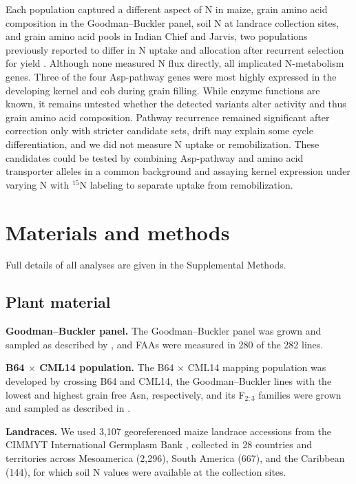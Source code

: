 \documentclass[namedate,unnumsec,webpdf,contemporary,large]{oup-authoring-template}
\begin{document}
Each population captured a different aspect of N in maize, grain amino acid composition in the Goodman--Buckler panel, soil N at landrace collection sites, and grain amino acid pools in Indian Chief and Jarvis, two populations previously reported to differ in N uptake and allocation after recurrent selection for yield \citep{Moll1994}. Although none measured N flux directly, all implicated N-metabolism genes. Three of the four Asp-pathway genes were most highly expressed in the developing kernel and cob during grain filling. While enzyme functions are known, it remains untested whether the detected variants alter activity and thus grain amino acid composition. Pathway recurrence remained significant after correction only with stricter candidate sets, drift may explain some cycle differentiation, and we did not measure N uptake or remobilization. These candidates could be tested by combining Asp-pathway and amino acid transporter alleles in a common background and assaying kernel expression under varying N with $^{15}$N labeling to separate uptake from remobilization.


\section{Materials and methods}
Full details of all analyses are given in the Supplemental Methods.

\subsection{Plant material}

\noindent\textbf{Goodman--Buckler panel.} The Goodman--Buckler panel \citep{FlintGarcia2005Goodman} was grown and sampled as described by \citet{Shrestha2022}, and FAAs were measured in 280 of the 282 lines.

\noindent\textbf{B64 $\times$ CML14 population.} The B64 $\times$ CML14 mapping population was developed by crossing B64 and CML14, the Goodman--Buckler lines with the lowest and highest grain free Asn, respectively, and its F$_{2:3}$ families were grown and sampled as described in \citet{Fitzsimmons2026KernelKitchen}.

\noindent\textbf{Landraces.} We used 3,107 georeferenced maize landrace accessions from the CIMMYT International Germplasm Bank \citep{RomeroNavarro2017Landraces}, collected in 28 countries and territories across Mesoamerica (2,296), South America (667), and the Caribbean (144), for which soil N values were available at the collection sites.
\end{document}
